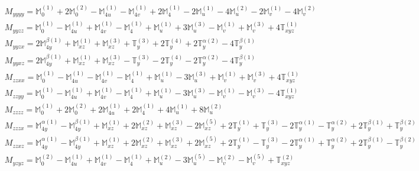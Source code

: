 \documentclass[fleqn,8pt,landscape]{jsarticle}
\begin{document}
\begin{align*}
& M_{yyyy} = \mathbb{M}_{0}^{(1)} + 2 \mathbb{M}_{0}^{(2)} - \mathbb{M}_{4u}^{(1)} - \mathbb{M}_{4v}^{(1)} + 2 \mathbb{M}_{4}^{(1)} - 2 \mathbb{M}_{u}^{(1)} - 4 \mathbb{M}_{u}^{(2)} - 2 \mathbb{M}_{v}^{(1)} - 4 \mathbb{M}_{v}^{(2)} \\
& M_{yyzz} = \mathbb{M}_{0}^{(1)} - \mathbb{M}_{4u}^{(1)} + \mathbb{M}_{4v}^{(1)} - \mathbb{M}_{4}^{(1)} + \mathbb{M}_{u}^{(1)} + 3 \mathbb{M}_{u}^{(3)} - \mathbb{M}_{v}^{(1)} + \mathbb{M}_{v}^{(3)} + 4 \mathbb{T}_{xyz}^{(1)} \\
& M_{yyzx} = 2 \mathbb{M}_{4y}^{\beta(1)} + \mathbb{M}_{xz}^{(1)} + \mathbb{M}_{xz}^{(3)} + \mathbb{T}_{y}^{(3)} + 2 \mathbb{T}_{y}^{(4)} + 2 \mathbb{T}_{y}^{\alpha(2)} - 4 \mathbb{T}_{y}^{\beta(1)} \\
& M_{yyxz} = 2 \mathbb{M}_{4y}^{\beta(1)} + \mathbb{M}_{xz}^{(1)} + \mathbb{M}_{xz}^{(3)} - \mathbb{T}_{y}^{(3)} - 2 \mathbb{T}_{y}^{(4)} - 2 \mathbb{T}_{y}^{\alpha(2)} - 4 \mathbb{T}_{y}^{\beta(1)} \\
& M_{zzxx} = \mathbb{M}_{0}^{(1)} - \mathbb{M}_{4u}^{(1)} - \mathbb{M}_{4v}^{(1)} - \mathbb{M}_{4}^{(1)} + \mathbb{M}_{u}^{(1)} - 3 \mathbb{M}_{u}^{(3)} + \mathbb{M}_{v}^{(1)} + \mathbb{M}_{v}^{(3)} + 4 \mathbb{T}_{xyz}^{(1)} \\
& M_{zzyy} = \mathbb{M}_{0}^{(1)} - \mathbb{M}_{4u}^{(1)} + \mathbb{M}_{4v}^{(1)} - \mathbb{M}_{4}^{(1)} + \mathbb{M}_{u}^{(1)} - 3 \mathbb{M}_{u}^{(3)} - \mathbb{M}_{v}^{(1)} - \mathbb{M}_{v}^{(3)} - 4 \mathbb{T}_{xyz}^{(1)} \\
& M_{zzzz} = \mathbb{M}_{0}^{(1)} + 2 \mathbb{M}_{0}^{(2)} + 2 \mathbb{M}_{4u}^{(1)} + 2 \mathbb{M}_{4}^{(1)} + 4 \mathbb{M}_{u}^{(1)} + 8 \mathbb{M}_{u}^{(2)} \\
& M_{zzzx} = \mathbb{M}_{4y}^{\alpha(1)} - \mathbb{M}_{4y}^{\beta(1)} + \mathbb{M}_{xz}^{(1)} + 2 \mathbb{M}_{xz}^{(2)} + \mathbb{M}_{xz}^{(3)} - 2 \mathbb{M}_{xz}^{(5)} + 2 \mathbb{T}_{y}^{(1)} + \mathbb{T}_{y}^{(3)} - 2 \mathbb{T}_{y}^{\alpha(1)} - \mathbb{T}_{y}^{\alpha(2)} + 2 \mathbb{T}_{y}^{\beta(1)} + \mathbb{T}_{y}^{\beta(2)} \\
& M_{zzxz} = \mathbb{M}_{4y}^{\alpha(1)} - \mathbb{M}_{4y}^{\beta(1)} + \mathbb{M}_{xz}^{(1)} + 2 \mathbb{M}_{xz}^{(2)} + \mathbb{M}_{xz}^{(3)} + 2 \mathbb{M}_{xz}^{(5)} + 2 \mathbb{T}_{y}^{(1)} - \mathbb{T}_{y}^{(3)} - 2 \mathbb{T}_{y}^{\alpha(1)} + \mathbb{T}_{y}^{\alpha(2)} + 2 \mathbb{T}_{y}^{\beta(1)} - \mathbb{T}_{y}^{\beta(2)} \\
& M_{yzyz} = \mathbb{M}_{0}^{(2)} - \mathbb{M}_{4u}^{(1)} + \mathbb{M}_{4v}^{(1)} - \mathbb{M}_{4}^{(1)} + \mathbb{M}_{u}^{(2)} - 3 \mathbb{M}_{u}^{(5)} - \mathbb{M}_{v}^{(2)} - \mathbb{M}_{v}^{(5)} + \mathbb{T}_{xyz}^{(2)} \\

\end{align*}
\end{document}
